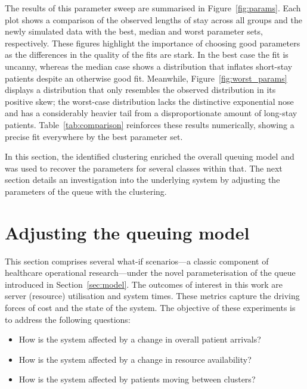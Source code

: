 \documentclass[]{interact}
\theoremstyle{plain}%
\theoremstyle{definition}
\theoremstyle{remark}
\begin{document}
The results of this parameter sweep are summarised in Figure~\ref{fig:params}.
Each plot shows a comparison of the observed lengths of stay across all groups
and the newly simulated data with the best, median and worst parameter sets,
respectively. These figures highlight the importance of choosing good parameters
as the differences in the quality of the fits are stark. In the best case the
fit is uncanny, whereas the median case shows a distribution that inflates
short-stay patients despite an otherwise good fit. Meanwhile,
Figure~\ref{fig:worst_params} displays a distribution that only resembles the
observed distribution in its positive skew; the worst-case distribution lacks
the distinctive exponential nose and has a considerably heavier tail from a
disproportionate amount of long-stay patients. Table~\ref{tab:comparison}
reinforces these results numerically, showing a precise fit everywhere by the
best parameter set.

\begin{table}
    \centering
    \resizebox{\textwidth}{!}{}
    \caption{%
        A comparison of the observed and simulated data based on the model
        parameters and summary statistics for length of stay
    }\label{tab:comparison}
\end{table}

In this section, the identified clustering enriched the overall queuing model
and was used to recover the parameters for several classes within that. The next
section details an investigation into the underlying system by adjusting the
parameters of the queue with the clustering.


\section{Adjusting the queuing model}\label{sec:scenarios}

This section comprises several what-if scenarios---a classic component of
healthcare operational research---under the novel parameterisation of the
queue introduced in Section~\ref{sec:model}. The outcomes of interest in this
work are server (resource) utilisation and system times. These metrics capture
the driving forces of cost and the state of the system. The objective of these
experiments is to address the following questions:
\begin{itemize}
    \item How is the system affected by a change in overall patient arrivals?
    \item How is the system affected by a change in resource availability?
    \item How is the system affected by patients moving between clusters?
\end{itemize}
\end{document}
